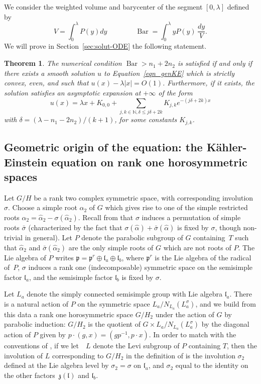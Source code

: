 \documentclass[JEP,XML,SOM,Unicode, NoEqCountersInSection, NoFloatCountersInSection]{cedram}
\theoremstyle{plain}
\newtheorem{thm}{Theorem}[section]
\theoremstyle{definition}
\DeclareMathOperator{\barDH}{Bar}
\newcommand{\ha}{\hat{\alpha}}
\begin{document}
We consider the weighted volume and barycenter of the segment $[0,\lambda]$ defined by
\[ V=\int_0^{\lambda}P(y)dy \qquad \qquad
\barDH = \int_0^{\lambda} yP(y)\,\frac{dy}{V}. \]
We will prove in Section~\ref{sec:solut-ODE} the following statement.

\begin{thm}
\label{thm:ODE}
The numerical condition $\barDH>n_1+2n_2$ is satisfied if and only if
there exists a smooth solution $u$ to Equation~\eqref{eqn_genKE}
which is strictly convex, even, and such that $u(x)-\lambda|x|=O(1)$.
Furthermore, if it exists, the solution satisfies
an asymptotic expansion at $+\infty$ of the form
\[ u(x)= \lambda x +K_{0,0}+
\sum_{j,k\in \mathbb{N}, \delta\leq j\delta+2k}K_{j,k}e^{-(j\delta+2k)x} \]
with $\delta=(\lambda-n_1-2n_2)/(k+1)$,
for some constants $K_{j,k}$.
\end{thm}

\subsection{Geometric origin of the equation: the Kähler-Einstein equation on rank one horosymmetric spaces}
\label{sec:facets}

Let $G/H$ be a rank two complex symmetric space, with corresponding involution $\sigma$.
Choose a simple root $\ha_2$ of $G$ which gives rise to one of the simple restricted roots
$\alpha_2=\ha_2-\sigma(\ha_2)$.
Recall from \cite{DCP83} that $\sigma$ induces a permutation
of simple roots $\bar{\sigma}$ (characterized by the fact that
$\sigma(\ha)+\bar{\sigma}(\ha)$ is fixed by $\sigma$, though non-trivial in general).
Let $P$ denote the parabolic subgroup of $G$ containing~$T$ such that
$\ha_2$ and $\bar{\sigma}(\ha_2)$ are the only simple roots of $G$ which are not roots
of $P$. The Lie algebra of $P$ writes
$\mathfrak{p}=\mathfrak{p}^r \oplus \mathfrak{l}_a \oplus \mathfrak{l}_b$,
where $\mathfrak{p}^r$ is the Lie algebra of the radical of~$P$,
$\sigma$ induces a rank one (indecomposable) symmetric space on the
semisimple factor $\mathfrak{l}_a$, and the semisimple factor
$\mathfrak{l}_b$ is fixed by $\sigma$.

Let $L_a$ denote the simply connected semisimple group with Lie algebra
$\mathfrak{l}_a$. There is a natural action of $P$ on the symmetric
space $L_a/N_{L_a}(L_a^{\sigma})$, and we build from this data a rank one
horosymmetric space $G/H_2$ under the action of $G$ by parabolic induction:
$G/H_2$ is the quotient of $G\times L_a/N_{L_a}(L_a^{\sigma})$ by the
diagonal action of $P$ given by $p\cdot (g,x)=(gp^{-1},p\cdot x)$.
In order to match with the conventions of \cite{DelHoro},
if we let~ $L$ denote the Levi subgroup of $P$ containing $T$, then the involution
of $L$ corresponding to $G/H_2$ in the definition of \cite{DelHoro} is
the involution $\sigma_2$ defined at the Lie algebra level by $\sigma_2=\sigma$
on $\mathfrak{l}_a$, and $\sigma_2$ equal to the identity on the other factors~$\mathfrak{z}(\mathfrak{l})$ and $\mathfrak{l}_b$.
\end{document}
